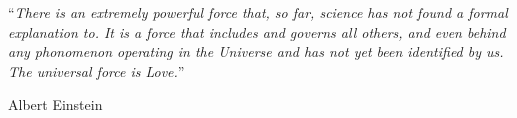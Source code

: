 \documentclass[11pt, english, singlespacing, headsepline,]{FinalReport}
\begin{document}
\noindent\enquote{\itshape There is an extremely powerful force that, so far, science has not found a formal explanation to. It is a force that includes and governs all others, and even behind any phonomenon operating in the Universe and has not yet been identified by us. The universal force is Love.}\bigbreak

\hfill Albert Einstein


\begin{abstract}

\addchaptertocentry{\abstractname} %


\end{abstract}
\end{document}
